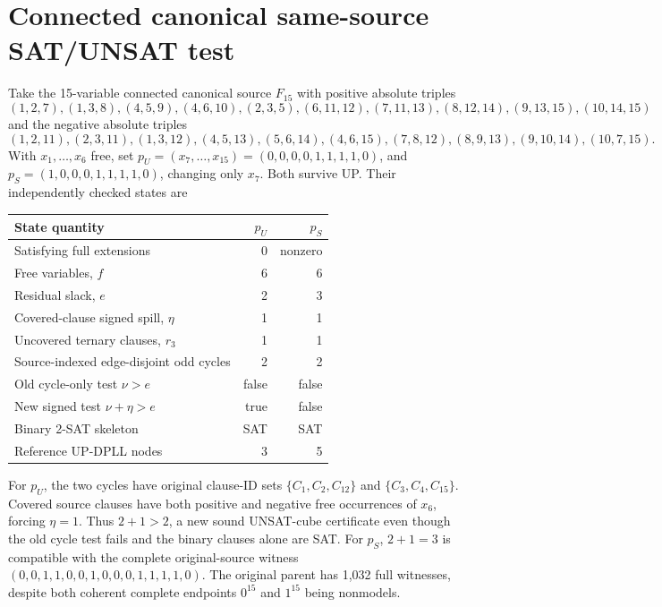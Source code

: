 \documentclass[11pt]{article}
\begin{document}
\section{Connected canonical same-source SAT/UNSAT test}
Take the 15-variable connected canonical source $F_{15}$ with positive absolute triples
\[
(1,2,7),(1,3,8),(4,5,9),(4,6,10),(2,3,5),
(6,11,12),(7,11,13),(8,12,14),(9,13,15),(10,14,15)
\]
and the negative absolute triples
\[
(1,2,11),(2,3,11),(1,3,12),(4,5,13),(5,6,14),
(4,6,15),(7,8,12),(8,9,13),(9,10,14),(10,7,15).
\]
With $x_1,\ldots,x_6$ free, set
$p_U=(x_7,\ldots,x_{15})=(0,0,0,0,1,1,1,1,0)$,
and $p_S=(1,0,0,0,1,1,1,1,0)$, changing only $x_7$.
Both survive UP. Their independently checked states are
\begin{center}\begin{tabular}{lrr}\toprule
State quantity & $p_U$ & $p_S$\\\midrule
Satisfying full extensions & 0 & nonzero\\
Free variables, $f$ & 6 & 6\\
Residual slack, $e$ & 2 & 3\\
Covered-clause signed spill, $\eta$ & 1 & 1\\
Uncovered ternary clauses, $r_3$ & 1 & 1\\
Source-indexed edge-disjoint odd cycles & 2 & 2\\
Old cycle-only test $\nu>e$ & false & false\\
New signed test $\nu+\eta>e$ & true & false\\
Binary 2-SAT skeleton & SAT & SAT\\
Reference UP-DPLL nodes & 3 & 5\\\bottomrule
\end{tabular}\end{center}
For $p_U$, the two cycles have original clause-ID sets
$\{C_1,C_2,C_{12}\}$ and $\{C_3,C_4,C_{15}\}$.
Covered source clauses have both positive and negative free
occurrences of $x_6$, forcing $\eta=1$.
Thus $2+1>2$, a new sound UNSAT-cube certificate even
though the old cycle test fails and the binary clauses alone are SAT.
For $p_S$, $2+1=3$ is compatible with the complete original-source
witness $(0,0,1,1,0,0,1,0,0,0,1,1,1,1,0)$.
The original parent has 1,032 full witnesses, despite both coherent
complete endpoints $0^{15}$ and $1^{15}$ being nonmodels.
\end{document}
